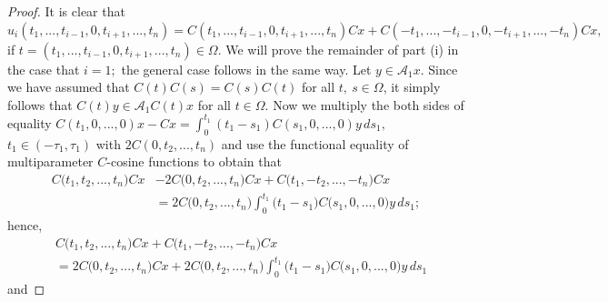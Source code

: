 \documentclass{amsart}
\theoremstyle{definition}
\theoremstyle{remark}
\numberwithin{equation}{section}
\begin{document}
\begin{proof}
It is clear that $u_{i}(t_{1},...,t_{i-1},0,t_{i+1},...,t_{n})=C(t_{1},...,t_{i-1},0,t_{i+1},...,t_{n})Cx+C(-t_{1},...,-t_{i-1},0,-t_{i+1},...,-t_{n})Cx,$ if $t= (t_{1},...,t_{i-1},0,t_{i+1},...,t_{n} ) \in \Omega.$ We will prove the remainder of part (i) in the case that $i=1;$ the general case follows in the same way. Let $y\in {\mathcal A}_{1}x.$  Since we have assumed that $C(t)C(s)=C(s)C(t)$ for all $t,\ s\in \Omega$, it simply follows that $C(t)y\in {\mathcal A}_{1}C(t)x$
for all $t\in \Omega.$ Now we multiply the both sides of equality $C(t_{1},0,...,0)x-Cx=\int^{t_{1}}_{0}(t_{1}-s_{1})C(s_{1},0,...,0)y\, ds_{1},$ $t_{1}\in (-\tau_{1},\tau_{1})$ with $2C(0,t_{2},...,t_{n})$ and use the functional equality of multiparameter $C$-cosine functions to obtain that
\begin{align*}
C\bigl(t_{1},t_{2},...,t_{n}\bigr)Cx&-2C\bigl(0,t_{2},...,t_{n}\bigr)Cx+C\bigl(t_{1},-t_{2},...,-t_{n}\bigr)Cx
\\&=2C\bigl(0,t_{2},...,t_{n}\bigr)\int^{t_{1}}_{0}\bigl(t_{1}-s_{1}\bigr)C\bigl(s_{1},0,...,0\bigr)y\, ds_{1};
\end{align*}  
hence,
\begin{align*}&
C\bigl(t_{1},t_{2},...,t_{n}\bigr)Cx+C\bigl(t_{1},-t_{2},...,-t_{n}\bigr)Cx
\\& =2C\bigl(0,t_{2},...,t_{n}\bigr)Cx+2C\bigl(0,t_{2},...,t_{n}\bigr)\int^{t_{1}}_{0}\bigl(t_{1}-s_{1}\bigr)C\bigl(s_{1},0,...,0\bigr)y\, ds_{1}
\end{align*}  
and


\end{proof}
\end{document}
